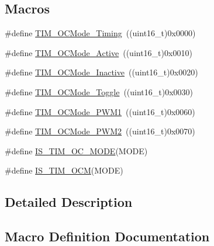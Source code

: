 \subsection*{Macros}
\begin{DoxyCompactItemize}
\item 
\#define \hyperlink{group___t_i_m___output___compare__and___p_w_m__modes_ga54d5745fade3b2f8ea1325e7447ca760}{T\+I\+M\+\_\+\+O\+C\+Mode\+\_\+\+Timing}~((uint16\+\_\+t)0x0000)
\item 
\#define \hyperlink{group___t_i_m___output___compare__and___p_w_m__modes_ga76bac57d41dc67218772f9c745c77102}{T\+I\+M\+\_\+\+O\+C\+Mode\+\_\+\+Active}~((uint16\+\_\+t)0x0010)
\item 
\#define \hyperlink{group___t_i_m___output___compare__and___p_w_m__modes_gae0c350d7adaea14a37cabc2ab762695f}{T\+I\+M\+\_\+\+O\+C\+Mode\+\_\+\+Inactive}~((uint16\+\_\+t)0x0020)
\item 
\#define \hyperlink{group___t_i_m___output___compare__and___p_w_m__modes_ga8b8adb6e81fe88bd14d44430f7f97021}{T\+I\+M\+\_\+\+O\+C\+Mode\+\_\+\+Toggle}~((uint16\+\_\+t)0x0030)
\item 
\#define \hyperlink{group___t_i_m___output___compare__and___p_w_m__modes_gaefbe32dddc9630fbcc48b302b50d15fc}{T\+I\+M\+\_\+\+O\+C\+Mode\+\_\+\+P\+W\+M1}~((uint16\+\_\+t)0x0060)
\item 
\#define \hyperlink{group___t_i_m___output___compare__and___p_w_m__modes_ga722d8f33a795ef82ed7ae76dfbb7613d}{T\+I\+M\+\_\+\+O\+C\+Mode\+\_\+\+P\+W\+M2}~((uint16\+\_\+t)0x0070)
\item 
\#define \hyperlink{group___t_i_m___output___compare__and___p_w_m__modes_ga93d898976e236c135bfd02a0c213c8ec}{I\+S\+\_\+\+T\+I\+M\+\_\+\+O\+C\+\_\+\+M\+O\+DE}(M\+O\+DE)
\item 
\#define \hyperlink{group___t_i_m___output___compare__and___p_w_m__modes_ga45f530dd241d3b0787b5c2d62cd1b98f}{I\+S\+\_\+\+T\+I\+M\+\_\+\+O\+CM}(M\+O\+DE)
\end{DoxyCompactItemize}


\subsection{Detailed Description}


\subsection{Macro Definition Documentation}
\mbox{\label{group___t_i_m___output___compare__and___p_w_m__modes_ga93d898976e236c135bfd02a0c213c8ec}} 
